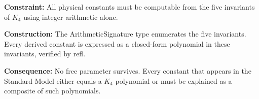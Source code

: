 \documentclass[11pt,a4paper]{book}
\def\texttt#1{#1}%
\begin{document}
\textbf{Constraint:}
All physical constants must be computable from the five invariants of
$K_4$ using integer arithmetic alone.

\textbf{Construction:}
The \texttt{ArithmeticSignature} type enumerates the five invariants.
Every derived constant is expressed as a closed-form polynomial in
these invariants, verified by \texttt{refl}.

\textbf{Consequence:}
No free parameter survives.  Every constant that appears in the Standard
Model either equals a $K_4$ polynomial or must be explained as a composite
of such polynomials.

\begin{code}%
\>[0]\<%
\\
%
\\[\AgdaEmptyExtraSkip]%
\>[0]\AgdaSpace{}%
\AgdaSpace{}%
\AgdaSymbol{:}\AgdaSpace{}%
\AgdaSpace{}%
\<%
\\
\>[0][@{}l@{\AgdaIndent{0}}]%
\>[2]%
\>[14]\AgdaSymbol{:}\AgdaSpace{}%
\<%
\\
%
\>[2]%
\>[14]\AgdaSymbol{:}\AgdaSpace{}%
\<%
\\
%
\>[2]%
\>[14]\AgdaSymbol{:}\AgdaSpace{}%
\<%
\\
%
\>[2]%
\>[14]\AgdaSymbol{:}\AgdaSpace{}%
\<%
\\
%
\>[2]%
\>[14]\AgdaSymbol{:}\AgdaSpace{}%
\<%
\\
%
\\[\AgdaEmptyExtraSkip]%
\>[0]\AgdaSpace{}%
\AgdaSpace{}%
\AgdaSymbol{:}\AgdaSpace{}%
\AgdaSpace{}%
\<%
\\
\>[0][@{}l@{\AgdaIndent{0}}]%
\>[2]%
\>[18]\AgdaSymbol{:}\AgdaSpace{}%
\<%
\\
%
\>[2]%
\>[18]\AgdaSymbol{:}\AgdaSpace{}%
\<%
\\

\end{code}
\end{document}
